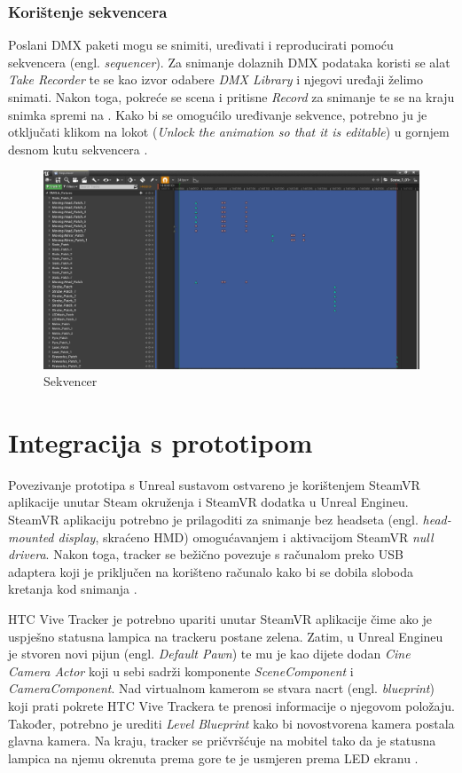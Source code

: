 \documentclass[times, utf8, zavrsni, numeric]{fer}
\begin{document}
\subsection{Korištenje sekvencera}
Poslani DMX paketi mogu se snimiti, uređivati i reproducirati pomoću sekvencera (engl. \emph{sequencer}). Za snimanje dolaznih DMX podataka koristi se alat \emph{Take Recorder} te se kao izvor odabere \emph{DMX Library} i njegovi uređaji želimo snimati. Nakon toga, pokreće se scena i pritisne \emph{Record} za snimanje te se na kraju snimka spremi na . Kako bi se omogućilo uređivanje sekvence, potrebno ju je otključati klikom na lokot (\emph{Unlock the animation so that it is editable}) u gornjem desnom kutu sekvencera \cite{dmx_tracks}.\\

\begin{figure}[htp]
	\centering
	\includegraphics[width=\linewidth]{slika 6-12.png}
	\caption{Sekvencer}
	\label{fig:slika 6-12}
\end{figure}

\chapter{Integracija s prototipom}
Povezivanje prototipa s Unreal sustavom ostvareno je korištenjem SteamVR aplikacije unutar Steam okruženja i SteamVR dodatka u Unreal Engineu. SteamVR aplikaciju potrebno je prilagoditi za snimanje bez headseta (engl. \emph{head-mounted display}, skraćeno HMD) omogućavanjem i aktivacijom SteamVR \emph{null drivera}. Nakon toga, tracker se bežično povezuje s računalom preko USB adaptera koji je priključen na korišteno računalo kako bi se dobila sloboda kretanja kod snimanja \cite{vp}. \newline

HTC Vive Tracker je potrebno upariti unutar SteamVR aplikacije čime ako je uspješno statusna lampica na trackeru postane zelena. Zatim, u Unreal Engineu je stvoren novi pijun (engl. \emph{Default Pawn}) te mu je kao dijete dodan \emph{Cine Camera Actor} koji u sebi sadrži komponente \emph{SceneComponent} i \emph{CameraComponent}. Nad virtualnom kamerom se stvara nacrt (engl. \emph{blueprint}) koji prati pokrete HTC Vive Trackera te prenosi informacije o njegovom položaju. Također, potrebno je urediti \emph{Level Blueprint} kako bi novostvorena kamera postala glavna kamera. Na kraju, tracker se pričvršćuje na mobitel tako da je statusna lampica na njemu okrenuta prema gore te je usmjeren prema LED ekranu \cite{vp}. \newline
\end{document}
